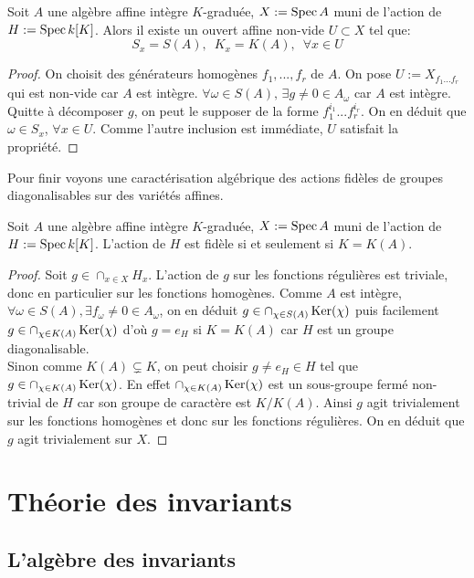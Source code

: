 \begin{prop}
Soit $A$ une algèbre affine intègre $K$-graduée, $X:=\operatorname{Spec} A$ muni de l'action de $H:=\operatorname{Spec} k[K]$. Alors il existe un ouvert affine non-vide $U\subset X$ tel que:
$$S_x=S(A),\,\,\, K_x=K(A),\,\,\, \forall x\in U$$
\end{prop}
\begin{proof}
On choisit des générateurs homogènes $f_1,...,f_r$ de $A$. On pose $U:=X_{f_1...f_r}$ qui est non-vide car $A$ est intègre. $\forall \omega \in S(A),\, \exists g\neq0 \in A_\omega$ car $A$ est intègre. Quitte à décomposer $g$,  on peut le supposer de la forme $f_1^{i_1}...f_r^{i_r}$. On en déduit que $\omega \in S_x$, $\forall x\in U$. Comme l'autre inclusion est immédiate, $U$ satisfait la propriété.
\end{proof}


Pour finir voyons une caractérisation algébrique des actions fidèles de groupes diagonalisables sur des variétés affines.

\begin{prop}
Soit $A$ une algèbre affine intègre $K$-graduée, $X:=\operatorname{Spec} A$ muni de l'action de $H:=\operatorname{Spec} k[K]$. L'action de $H$ est fidèle si et seulement si $K=K(A)$.
\end{prop}
\begin{proof}
Soit $g\in \cap_{x\in X}H_x$. L'action de $g$ sur les fonctions régulières est triviale, donc en particulier sur les fonctions homogènes. Comme $A$ est intègre, $\forall \omega \in S(A), \exists f_\omega\neq 0\in A_\omega$, on en déduit $g\in \cap_{\chi \in S(A)} \operatorname{Ker}(\chi)$ puis facilement $g\in \cap_{\chi \in K(A)} \operatorname{Ker}(\chi)$ d'où $g=e_H$ si $K=K(A)$ car $H$ est un groupe diagonalisable.\\
Sinon comme $K(A)\subsetneq K$, on peut choisir $g\neq e_H\in H$ tel que $g\in\cap_{\chi \in K(A)} \operatorname{Ker}(\chi)$. En effet $\cap_{\chi \in K(A)} \operatorname{Ker}(\chi)$ est un sous-groupe fermé non-trivial de $H$ car son groupe de caractère est $K/K(A)$. Ainsi $g$ agit trivialement sur les fonctions homogènes et donc sur les fonctions régulières. On en déduit que $g$ agit trivialement sur $X$.
\end{proof}

\section{Théorie des invariants}
\subsection{L'algèbre des invariants}

